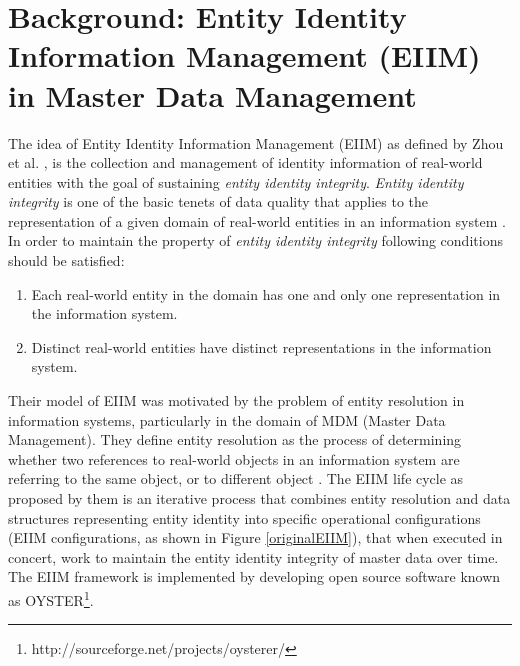 





%
%




\section{Background: Entity Identity Information Management (EIIM) in Master Data Management\label{backgroundEIIM}}
The idea of Entity Identity Information Management (EIIM) as defined by Zhou et al. \cite{zhou2011entity}, is the collection and management of identity information of real-world entities with the goal of sustaining \textit{entity identity integrity}. \textit{Entity identity integrity} is one of the basic tenets of data quality that applies to the representation of a given domain of real-world entities in an information system \cite{talburt2011entity}. In order to maintain the property of \textit{entity identity integrity} following conditions should be satisfied:

\begin{enumerate}
\item Each real-world entity in the domain has one and only one representation in the information system.

\item Distinct real-world entities have distinct representations in the information system.
\end{enumerate}


Their model of EIIM was motivated by the problem of entity resolution in information systems, particularly in the domain of MDM (Master Data Management). They define entity resolution as the process of determining whether two references to real-world objects in an information system are referring to the same object, or to different object \cite{talburt2011entity}. The EIIM life cycle as proposed by them is an iterative process that combines entity resolution and data structures representing entity identity into specific operational configurations (EIIM configurations, as shown in Figure \ref{originalEIIM}), that when executed in concert, work to maintain the entity identity integrity of master data over time. The EIIM framework is implemented by developing open source software known as OYSTER\footnote{http://sourceforge.net/projects/oysterer/}.

